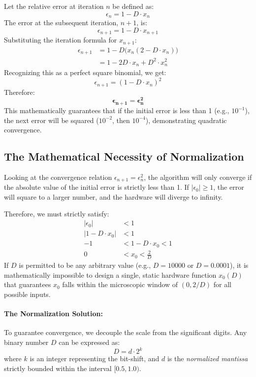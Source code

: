 \documentclass{article}
\begin{document}
Let the relative error at iteration $n$ be defined as:
\begin{equation}
    \epsilon_n = 1 - D \cdot x_n
\end{equation}
The error at the subsequent iteration, $n+1$, is:
\begin{equation}
    \epsilon_{n+1} = 1 - D \cdot x_{n+1}
\end{equation}
Substituting the iteration formula for $x_{n+1}$:
\begin{align*}
    \epsilon_{n+1} &= 1 - D \big( x_n(2 - D \cdot x_n) \big) \\
    &= 1 - 2D \cdot x_n + D^2 \cdot x_n^2
\end{align*}
Recognizing this as a perfect square binomial, we get:
\begin{equation}
    \epsilon_{n+1} = (1 - D \cdot x_n)^2
\end{equation}
Therefore:
\begin{equation}
    \mathbf{\epsilon_{n+1} = \epsilon_n^2}
\end{equation}
This mathematically guarantees that if the initial error is less than 1 (e.g., $10^{-1}$), the next error will be squared ($10^{-2}$, then $10^{-4}$), demonstrating quadratic convergence.

\subsection{The Mathematical Necessity of Normalization}
Looking at the convergence relation $\epsilon_{n+1} = \epsilon_n^2$, the algorithm will only converge if the absolute value of the initial error is strictly less than 1. If $|\epsilon_0| \ge 1$, the error will square to a larger number, and the hardware will diverge to infinity.

Therefore, we must strictly satisfy:
\begin{align*}
    |\epsilon_0| &< 1 \\
    |1 - D \cdot x_0| &< 1 \\
    -1 &< 1 - D \cdot x_0 < 1 \\
    0 &< x_0 < \frac{2}{D}
\end{align*}
If $D$ is permitted to be any arbitrary value (e.g., $D = 10000$ or $D = 0.0001$), it is mathematically impossible to design a single, static hardware function $x_0(D)$ that guarantees $x_0$ falls within the microscopic window of $(0, 2/D)$ for all possible inputs.

\paragraph{The Normalization Solution:}
To guarantee convergence, we decouple the scale from the significant digits. Any binary number $D$ can be expressed as:
\begin{equation}
    D = d \cdot 2^k
\end{equation}
where $k$ is an integer representing the bit-shift, and $d$ is the \textit{normalized mantissa} strictly bounded within the interval $[0.5, 1.0)$. 
\end{document}
